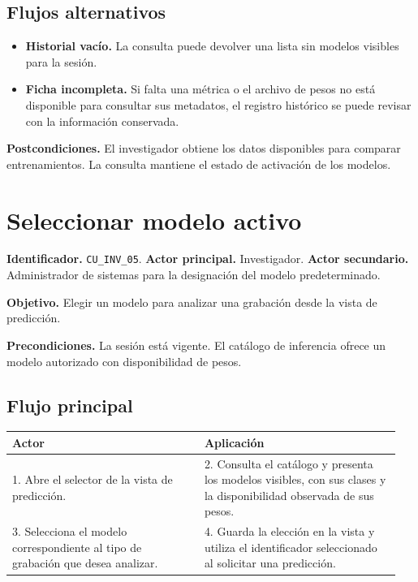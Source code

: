 \subsection*{Flujos alternativos}

\begin{itemize}
    \item \textbf{Historial vacío.} La consulta puede devolver una
    lista sin modelos visibles para la sesión.
    \item \textbf{Ficha incompleta.} Si falta una métrica o el archivo
    de pesos no está disponible para consultar sus metadatos, el
    registro histórico se puede revisar con la información conservada.
\end{itemize}

\noindent\textbf{Postcondiciones.} El investigador obtiene los datos
disponibles para comparar entrenamientos. La consulta mantiene el
estado de activación de los modelos.

\section{Seleccionar modelo activo}
\label{cu:inv-05}

\noindent\textbf{Identificador.} \texttt{CU\_INV\_05}.
\textbf{Actor principal.} Investigador.
\textbf{Actor secundario.} Administrador de sistemas para la designación
del modelo predeterminado.

\noindent\textbf{Objetivo.} Elegir un modelo para analizar una grabación
desde la vista de predicción.

\noindent\textbf{Precondiciones.} La sesión está vigente. El catálogo
de inferencia ofrece un modelo autorizado con disponibilidad de pesos.

\subsection*{Flujo principal}

\noindent
\begin{tabular}{@{}p{0.47\linewidth}p{0.48\linewidth}@{}}
    \hline
    \textbf{Actor} & \textbf{Aplicación} \\
    \hline
    1. Abre el selector de la vista de predicción. &
    2. Consulta el catálogo y presenta los modelos visibles, con sus clases y la disponibilidad observada de sus pesos. \\
    3. Selecciona el modelo correspondiente al tipo de grabación que desea analizar. &
    4. Guarda la elección en la vista y utiliza el identificador seleccionado al solicitar una predicción. \\
    \hline
\end{tabular}

